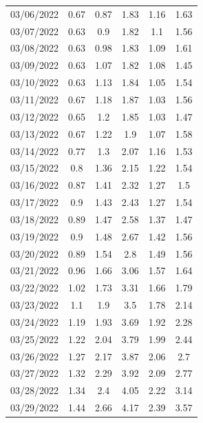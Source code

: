 \documentclass[withoutpreface,bwprint]{cumcmthesis} %
\begin{document}
\begin{appendices}
\begin{center}
\begin{longtable}{c|ccccc}
03/06/2022 & 0.67  & 0.87     & 1.83      & 1.16   & 1.63          \\
03/07/2022 & 0.63  & 0.9      & 1.82      & 1.1    & 1.56          \\
03/08/2022 & 0.63  & 0.98     & 1.83      & 1.09   & 1.61          \\
03/09/2022 & 0.63  & 1.07     & 1.82      & 1.08   & 1.45          \\
03/10/2022 & 0.63  & 1.13     & 1.84      & 1.05   & 1.54          \\
03/11/2022 & 0.67  & 1.18     & 1.87      & 1.03   & 1.56          \\
03/12/2022 & 0.65  & 1.2      & 1.85      & 1.03   & 1.47          \\
03/13/2022 & 0.67  & 1.22     & 1.9       & 1.07   & 1.58          \\
03/14/2022 & 0.77  & 1.3      & 2.07      & 1.16   & 1.53          \\
03/15/2022 & 0.8   & 1.36     & 2.15      & 1.22   & 1.54          \\
03/16/2022 & 0.87  & 1.41     & 2.32      & 1.27   & 1.5           \\
03/17/2022 & 0.9   & 1.43     & 2.43      & 1.27   & 1.54          \\
03/18/2022 & 0.89  & 1.47     & 2.58      & 1.37   & 1.47          \\
03/19/2022 & 0.9   & 1.48     & 2.67      & 1.42   & 1.56          \\
03/20/2022 & 0.89  & 1.54     & 2.8       & 1.49   & 1.56          \\
03/21/2022 & 0.96  & 1.66     & 3.06      & 1.57   & 1.64          \\
03/22/2022 & 1.02  & 1.73     & 3.31      & 1.66   & 1.79          \\
03/23/2022 & 1.1   & 1.9      & 3.5       & 1.78   & 2.14          \\
03/24/2022 & 1.19  & 1.93     & 3.69      & 1.92   & 2.28          \\
03/25/2022 & 1.22  & 2.04     & 3.79      & 1.99   & 2.44          \\
03/26/2022 & 1.27  & 2.17     & 3.87      & 2.06   & 2.7           \\
03/27/2022 & 1.32  & 2.29     & 3.92      & 2.09   & 2.77          \\
03/28/2022 & 1.34  & 2.4      & 4.05      & 2.22   & 3.14          \\
03/29/2022 & 1.44  & 2.66     & 4.17      & 2.39   & 3.57          \\

\end{longtable}
\end{center}
\end{appendices}
\end{document}
